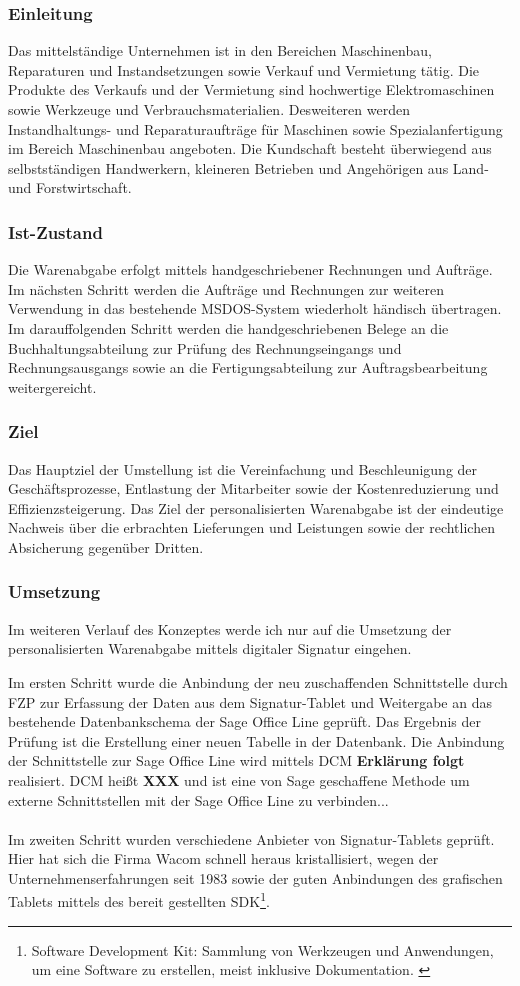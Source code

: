 \subsubsection*{Einleitung}
Das mittelständige Unternehmen ist in den Bereichen Maschinenbau, Reparaturen und Instandsetzungen sowie Verkauf und Vermietung tätig. Die Produkte des Verkaufs und der Vermietung sind hochwertige Elektromaschinen sowie Werkzeuge und Verbrauchsmaterialien. Desweiteren werden Instandhaltungs- und Reparaturaufträge für Maschinen sowie Spezialanfertigung im Bereich Maschinenbau angeboten. Die Kundschaft besteht überwiegend aus selbstständigen Handwerkern, kleineren Betrieben und Angehörigen aus Land- und Forstwirtschaft.
\subsubsection*{Ist-Zustand}
Die Warenabgabe erfolgt mittels handgeschriebener Rechnungen und Aufträge. Im nächsten Schritt werden die Aufträge und Rechnungen zur weiteren Verwendung in das bestehende MSDOS-System wiederholt händisch übertragen. Im darauffolgenden Schritt werden die handgeschriebenen Belege an die Buchhaltungsabteilung zur Prüfung des Rechnungseingangs und Rechnungsausgangs sowie an die Fertigungsabteilung zur Auftragsbearbeitung weitergereicht.
\subsubsection*{Ziel}
Das Hauptziel der Umstellung ist die Vereinfachung und Beschleunigung der Geschäftsprozesse, Entlastung der Mitarbeiter sowie der Kostenreduzierung und Effizienzsteigerung. Das Ziel der personalisierten Warenabgabe ist der eindeutige Nachweis über die erbrachten Lieferungen und Leistungen sowie der rechtlichen Absicherung gegenüber Dritten. \cite{einleitung1}
\subsubsection*{Umsetzung}
Im weiteren Verlauf des Konzeptes werde ich nur auf die Umsetzung der personalisierten Warenabgabe mittels digitaler Signatur eingehen. 

Im ersten Schritt wurde die Anbindung der neu zuschaffenden Schnittstelle durch FZP zur Erfassung der Daten aus dem Signatur-Tablet und Weitergabe an das bestehende Datenbankschema der Sage Office Line geprüft. Das Ergebnis der Prüfung ist die Erstellung einer neuen Tabelle in der Datenbank. Die Anbindung der Schnittstelle zur Sage Office Line wird mittels DCM \textbf{Erklärung folgt} realisiert. DCM heißt \textbf{XXX} und ist eine von Sage geschaffene Methode um externe Schnittstellen mit der Sage Office Line zu verbinden...\\\\
Im zweiten Schritt wurden verschiedene Anbieter von Signatur-Tablets geprüft. Hier hat sich die Firma Wacom schnell heraus kristallisiert, wegen der Unternehmenserfahrungen seit 1983 sowie der guten Anbindungen des grafischen Tablets mittels des bereit gestellten SDK\footnote{\label{foot:4} Software Development Kit: Sammlung von Werkzeugen und Anwendungen, um eine Software zu erstellen, meist inklusive Dokumentation. \cite{SDK}}.